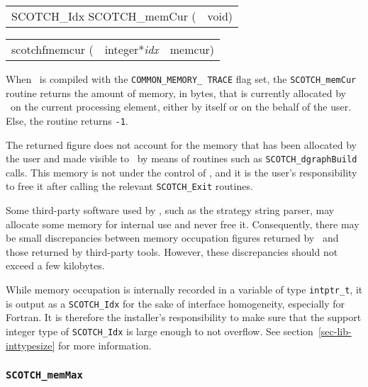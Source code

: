\begin{itemize}
\progsyn

{\tt\begin{tabular}{l@{}l}
SCOTCH\_Idx SCOTCH\_memCur ( & void)
\end{tabular}}

{\tt\begin{tabular}{l@{}ll}
scotchfmemcur ( & integer*{\it idx} & memcur) \\

\end{tabular}}

\progdes

When \scotch\ is compiled with the {\tt COMMON\_\lbt MEMORY\_\lbt
TRACE} flag set, the {\tt SCOTCH\_memCur} routine returns the amount
of memory, in bytes, that is currently allocated by \scotch\ on the
current processing element, either by itself or on the behalf of the
user. Else, the routine returns {\tt -1}.

The returned figure does not account for the memory that has been
allocated by the user and made visible to \scotch\ by means of
routines such as {\tt SCOTCH\_\lbt dgraph\lbt Build} calls. This
memory is not under the control of \scotch, and it is the user's
responsibility to free it after calling the relevant
{\tt SCOTCH\_\lbt *\lbt Exit} routines.

Some third-party software used by \scotch, such as the strategy string
parser, may allocate some memory for internal use and never free it.
Consequently, there may be small discrepancies between memory
occupation figures returned by \scotch\ and those returned by
third-party tools. However, these discrepancies should not exceed a
few kilobytes.

While memory occupation is internally recorded in a variable of type
{\tt intptr\_\lbt t}, it is output as a {\tt SCOTCH\_\lbt Idx} for the
sake of interface homogeneity, especially for Fortran. It is therefore
the installer's responsibility to make sure that the support integer
type of {\tt SCOTCH\_\lbt Idx} is large enough to not overflow. See
section~\ref{sec-lib-inttypesize} for more information.
\end{itemize}

\subsubsection{{\tt SCOTCH\_memMax}}

